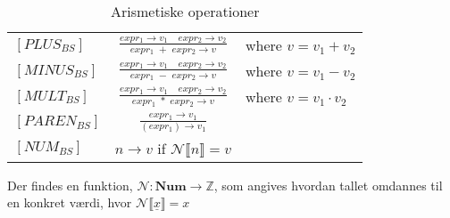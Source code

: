 \bgroup
\def\arraystretch{3}
\begin{table}[H]
\centering
\begin{tabular}{l c l}
    
    $[PLUS_{BS}]$ &$\frac{expr_1 \rightarrow v_1 \quad expr_2 \rightarrow v_2}{expr_1\;+\;expr_2 \rightarrow v}$ & where $v = v_1 + v_2$ \\
    
    $[MINUS_{BS}]$ &$\frac{expr_1 \rightarrow v_1 \quad expr_2 \rightarrow v_2}{expr_1\;-\;expr_2 \rightarrow v}$ & where $v = v_1 - v_2$ \\
    
    $[MULT_{BS}]$ &$\frac{expr_1 \rightarrow v_1 \quad expr_2 \rightarrow v_2}{expr_1\;*\;expr_2 \rightarrow v}$ & where $v = v_1 \cdot v_2$ \\
    
    $[PAREN_{BS}]$ &$\frac{expr_1 \rightarrow v_1}{(expr_1) \rightarrow v_1}$ & \\
    
    $[NUM_{BS}]$ &$n \rightarrow v$ if $\mathcal{N}\llbracket n\rrbracket = v$ & \\
    
\end{tabular}
\caption{Arismetiske operationer}
\label{tab:arithmetic}
\end{table}
\egroup

Der findes en funktion, $\mathcal{N} : \textbf{Num} \rightarrow \mathbb{Z}$, som angives hvordan tallet omdannes til en konkret værdi, hvor $\mathcal{N}\llbracket \underline{x}\rrbracket = x$

